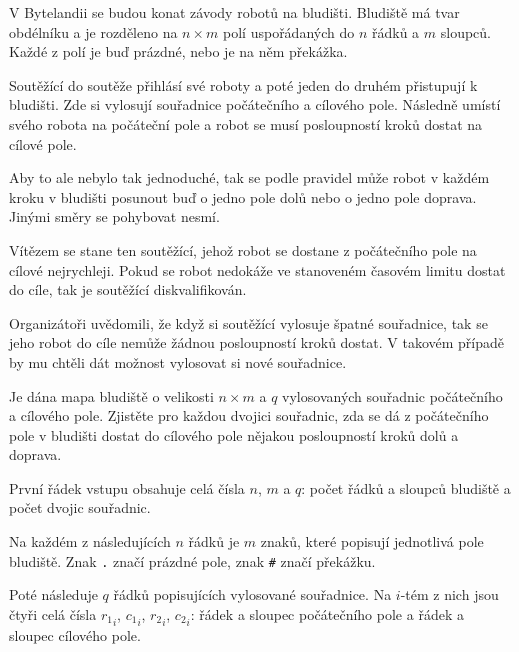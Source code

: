 





V Bytelandii se budou konat závody robotů na bludišti. Bludiště má tvar obdélníku a je rozděleno na $n \times m$ polí uspořádaných do $n$ řádků a $m$ sloupců. Každé z polí je buď prázdné, nebo je na něm překážka.

Soutěžící do soutěže přihlásí své roboty a poté jeden do druhém přistupují k bludišti. Zde si vylosují souřadnice počátečního a cílového pole. Následně umístí svého robota na počáteční pole a robot se musí posloupností kroků dostat na cílové pole.

Aby to ale nebylo tak jednoduché, tak se podle pravidel může robot v každém kroku v bludišti posunout buď o jedno pole dolů nebo o jedno pole doprava. Jinými směry se pohybovat nesmí.

Vítězem se stane ten soutěžící, jehož robot se dostane z počátečního pole na cílové nejrychleji. Pokud se robot nedokáže ve stanoveném časovém limitu dostat do cíle, tak je soutěžící diskvalifikován.

Organizátoři uvědomili, že když si soutěžící vylosuje špatné souřadnice, tak se jeho robot do cíle nemůže žádnou posloupností kroků dostat. V takovém případě by mu chtěli dát možnost vylosovat si nové souřadnice.


Je dána mapa bludiště o velikosti $n \times m$ a $q$ vylosovaných souřadnic počátečního a cílového pole. Zjistěte pro každou dvojici souřadnic, zda se dá z počátečního pole v bludišti dostat do cílového pole nějakou posloupností kroků dolů a doprava.


První řádek vstupu obsahuje celá čísla $n$, $m$ a $q$: počet řádků a sloupců bludiště a počet dvojic souřadnic.

Na každém z následujících $n$ řádků je $m$ znaků, které popisují jednotlivá pole bludiště. Znak \texttt{.} značí prázdné pole, znak \texttt{#} značí překážku.

Poté následuje $q$ řádků popisujících vylosované souřadnice. Na $i$-tém z nich jsou čtyři celá čísla ${r_1}_i$, ${c_1}_i$, ${r_2}_i$, ${c_2}_i$: řádek a sloupec počátečního pole a řádek a sloupec cílového pole.

